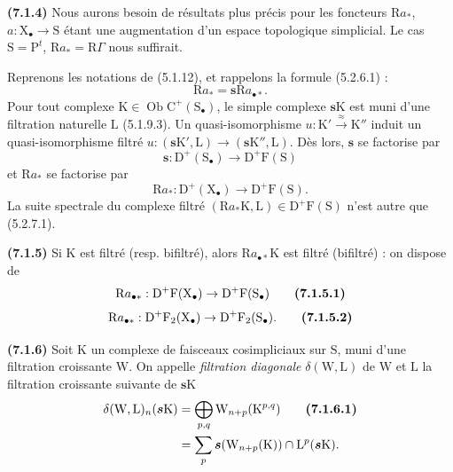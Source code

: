\documentclass[11pt,leqno]{article}
\begin{document}
\textbf{(7.1.4)} Nous aurons besoin de résultats plus précis pour les foncteurs \(\mathrm{R}a_{\ast}\), \(a:\mathrm{X}_{\bullet}\to\mathrm{S}\) étant une augmentation d’un espace topologique simplicial. Le cas \(\mathrm{S}=\mathrm{P}^{t}\), \(\mathrm{R}a_{\ast}=\mathrm{R}\Gamma\) nous suffirait.

Reprenons les notations de (5.1.12), et rappelons la formule (5.2.6.1) :
\[
\mathrm{R}a_{\ast}=\boldsymbol{s}\mathrm{R}a_{\bullet\ast}.
\]
Pour tout complexe \(\mathrm{K}\in\operatorname{Ob}\mathrm{C}^{+}(\mathrm{S}_{\bullet})\), le simple complexe \(\boldsymbol{s}\mathrm{K}\) est muni d’une filtration naturelle \(\mathrm{L}\) (5.1.9.3). Un quasi-isomorphisme \(u:\mathrm{K}'\xrightarrow{\approx}\mathrm{K}''\) induit un quasi-isomorphisme filtré \(u:(\boldsymbol{s}\mathrm{K}',\mathrm{L})\to(\boldsymbol{s}\mathrm{K}'',\mathrm{L})\). Dès lors, \(\boldsymbol{s}\) se factorise par
\[
\boldsymbol{s}:\mathrm{D}^{+}(\mathrm{S}_{\bullet})
\to\mathrm{D}^{+}\mathrm{F}(\mathrm{S})
\]
et \(\mathrm{R}a_{\ast}\) se factorise par
\[
\mathrm{R}a_{\ast}:\mathrm{D}^{+}(\mathrm{X}_{\bullet})
\to\mathrm{D}^{+}\mathrm{F}(\mathrm{S}).
\]
La suite spectrale du complexe filtré \((\mathrm{R}a_{\ast}\mathrm{K},\mathrm{L})\in\mathrm{D}^{+}\mathrm{F}(\mathrm{S})\) n’est autre que (5.2.7.1).

\textbf{(7.1.5)} Si \(\mathrm{K}\) est filtré (resp. bifiltré), alors \(\mathrm{R}a_{\bullet\ast}\mathrm{K}\) est filtré (bifiltré) : on dispose de
\[
\mathrm{R}a_{\bullet\ast}:
\mathrm{D}^{+}\mathrm{F}(\mathrm{X}_{\bullet})
\to\mathrm{D}^{+}\mathrm{F}(\mathrm{S}_{\bullet})
\tag*{\textbf{(7.1.5.1)}}
\]
\[
\mathrm{R}a_{\bullet\ast}:
\mathrm{D}^{+}\mathrm{F}_2(\mathrm{X}_{\bullet})
\to\mathrm{D}^{+}\mathrm{F}_2(\mathrm{S}_{\bullet}).
\tag*{\textbf{(7.1.5.2)}}
\]

\textbf{(7.1.6)} Soit \(\mathrm{K}\) un complexe de faisceaux cosimpliciaux sur \(\mathrm{S}\), muni d’une filtration croissante \(\mathrm{W}\). On appelle \textit{filtration diagonale} \(\delta(\mathrm{W},\mathrm{L})\) de \(\mathrm{W}\) et \(\mathrm{L}\) la filtration croissante suivante de \(\boldsymbol{s}\mathrm{K}\)
\begin{align*}
\delta(\mathrm{W},\mathrm{L})_n(\boldsymbol{s}\mathrm{K})
&=\bigoplus_{p,q}\mathrm{W}_{n+p}(\mathrm{K}^{p,q})
\tag*{\textbf{(7.1.6.1)}}\\
&=\sum_p\boldsymbol{s}(\mathrm{W}_{n+p}(\mathrm{K}))
\cap\mathrm{L}^{p}(\boldsymbol{s}\mathrm{K}).
\end{align*}
\end{document}
